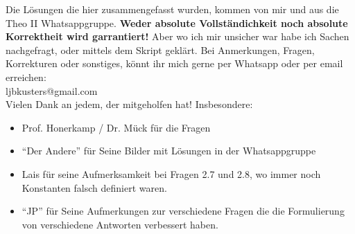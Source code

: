 \author{Luc Kusters}
\date{WS 19/20}
\maketitle

\noindent
Die Lösungen die hier zusammengefasst wurden, kommen von mir und
aus die Theo II Whatsappgruppe. 
\textbf{Weder absolute Vollständichkeit noch absolute Korrektheit wird garrantiert!} Aber wo ich mir unsicher war habe ich Sachen nachgefragt, oder 
mittels dem Skript geklärt.
Bei Anmerkungen, Fragen, Korrekturen oder sonstiges, könnt ihr mich gerne 
per Whatsapp oder per email erreichen:\\ 
ljbkusters@gmail.com \\

\noindent
Vielen Dank an jedem, der mitgeholfen hat! Insbesondere:
\begin{itemize}
  \item Prof. Honerkamp / Dr. Mück für die Fragen
  \item ``Der Andere'' für Seine Bilder mit Lösungen in der Whatsappgruppe
  \item Lais für seine Aufmerksamkeit bei Fragen 2.7 und 2.8, wo immer noch Konstanten falsch definiert waren.
  \item ``JP'' für Seine Aufmerkungen zur verschiedene Fragen die die 
    Formulierung von verschiedene Antworten verbessert haben.
\end{itemize}

